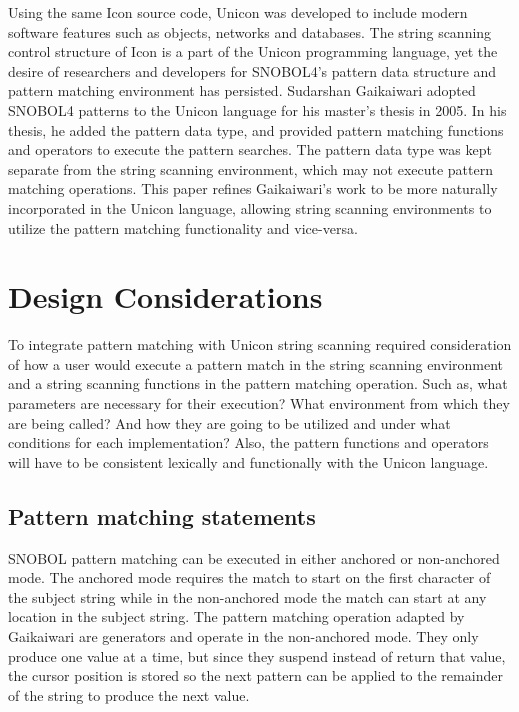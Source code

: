 \documentclass{article}
\begin{document}
Using the same Icon source code, Unicon was developed to include modern software features such as objects, networks and databases. \cite{JefferyUnicon} The string scanning control structure of Icon is a part of the Unicon programming language, yet the desire of researchers and developers for SNOBOL4's pattern data structure and pattern matching environment has persisted.  Sudarshan Gaikaiwari adopted SNOBOL4 patterns to the Unicon language for his master's thesis in 2005.  In his thesis, he added the pattern data type, and provided pattern matching functions and operators to execute the pattern searches.\cite{Gaikaiwari2005}  The pattern data type was kept separate from the string scanning environment, which may not execute pattern matching operations.  This paper refines Gaikaiwari's work to be more naturally incorporated in the Unicon language, allowing string scanning environments to utilize the pattern matching functionality and vice-versa.

\section{Design Considerations}
To integrate pattern matching with Unicon string scanning required consideration of how a user would execute a pattern match in the string scanning environment and a string scanning functions in the pattern matching operation.  Such as, what parameters are necessary for their execution?  What environment from which they are being called?  And how they are going to be utilized and under what conditions for each implementation?  Also, the pattern functions and operators will have to be consistent lexically and functionally with the Unicon language.

\subsection{Pattern matching statements}
SNOBOL pattern matching can be executed in either anchored or non-anchored mode.  The anchored mode requires the match to start on the first character of the subject string while in the non-anchored mode the match can start at any location in the subject string.\cite{Snobol}  The pattern matching operation adapted by Gaikaiwari are generators and operate in the non-anchored mode.\cite{Gaikaiwari2005}  They only produce one value at a time, but since they suspend instead of return that value, the cursor position is stored so the next pattern can be applied to the remainder of the string to produce the next value. \cite{JefferyUnicon}
\end{document}
